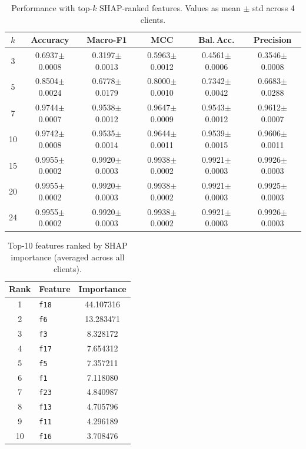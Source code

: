 \begin{table}[t]
\centering
\caption{Performance with top-$k$ SHAP-ranked features. Values as mean $\pm$ std across 4 clients.}
\label{tab:feature_reduction}
\begin{tabular}{cccccc}
\toprule
$k$ & Accuracy & Macro-F1 & MCC & Bal.\,Acc. & Precision \\
\midrule
3 & 0.6937$\pm$0.0008 & 0.3197$\pm$0.0013 & 0.5963$\pm$0.0012 & 0.4561$\pm$0.0006 & 0.3546$\pm$0.0008 \\
5 & 0.8504$\pm$0.0024 & 0.6778$\pm$0.0179 & 0.8000$\pm$0.0010 & 0.7342$\pm$0.0042 & 0.6683$\pm$0.0288 \\
7 & 0.9744$\pm$0.0007 & 0.9538$\pm$0.0012 & 0.9647$\pm$0.0009 & 0.9543$\pm$0.0012 & 0.9612$\pm$0.0007 \\
10 & 0.9742$\pm$0.0008 & 0.9535$\pm$0.0014 & 0.9644$\pm$0.0011 & 0.9539$\pm$0.0015 & 0.9606$\pm$0.0011 \\
15 & 0.9955$\pm$0.0002 & 0.9920$\pm$0.0003 & 0.9938$\pm$0.0002 & 0.9921$\pm$0.0003 & 0.9926$\pm$0.0003 \\
20 & 0.9955$\pm$0.0002 & 0.9920$\pm$0.0003 & 0.9938$\pm$0.0002 & 0.9921$\pm$0.0003 & 0.9925$\pm$0.0003 \\
24 & 0.9955$\pm$0.0002 & 0.9920$\pm$0.0003 & 0.9938$\pm$0.0002 & 0.9921$\pm$0.0003 & 0.9926$\pm$0.0003 \\
\bottomrule
\end{tabular}
\end{table}

\begin{table}[t]
\centering
\caption{Top-10 features ranked by SHAP importance (averaged across all clients).}
\label{tab:feature_ranking}
\begin{tabular}{clc}
\toprule
Rank & Feature & Importance \\
\midrule
1 & \texttt{f18} & 44.107316 \\
2 & \texttt{f6} & 13.283471 \\
3 & \texttt{f3} & 8.328172 \\
4 & \texttt{f17} & 7.654312 \\
5 & \texttt{f5} & 7.357211 \\
6 & \texttt{f1} & 7.118080 \\
7 & \texttt{f23} & 4.840987 \\
8 & \texttt{f13} & 4.705796 \\
9 & \texttt{f11} & 4.296189 \\
10 & \texttt{f16} & 3.708476 \\
\bottomrule
\end{tabular}
\end{table}
